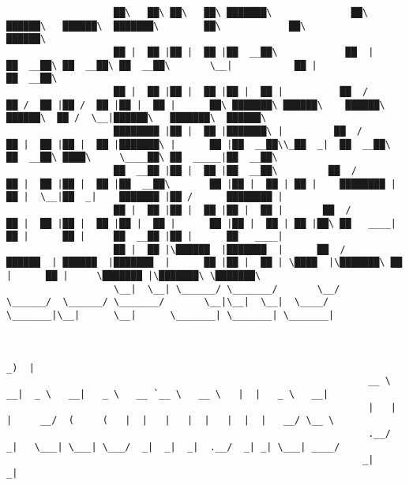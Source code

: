 \documentclass[varwidth=\maxdimen,margin=0.5cm,multi={verbatim}]{standalone}
\begin{document}
\begin{verbatim}
                   ██\   ██\ ██\   ██\ ███████\              ██\        ██████\   ██████\  ███████\        ██\            ██\                          ██████\
                   ██ |  ██ |██ |  ██ |██  __██\            ██  |      ██  __██\ ██  __██\ ██  __██\       \__|           ██ |                        ██  __██\
                   ██ |  ██ |██ |  ██ |██ |  ██ |          ██  /       ██ /  ██ |██ /  ██ |██ |  ██ |      ██\ ███████\ ██████\    ██████\   ██████\  ██ /  \__|██████\   ███████\  ██████\
                   ████████ |██ |  ██ |███████\ |         ██  /        ██ |  ██ |██ |  ██ |███████\ |      ██ |██  __██\\_██  _|  ██  __██\ ██  __██\ ████\     \____██\ ██  _____|██  __██\
                   ██  __██ |██ |  ██ |██  __██\         ██  /         ██ |  ██ |██ |  ██ |██  __██\       ██ |██ |  ██ | ██ |    ████████ |██ |  \__|██  _|    ███████ |██ /      ████████ |
                   ██ |  ██ |██ |  ██ |██ |  ██ |       ██  /          ██ |  ██ |██ |  ██ |██ |  ██ |      ██ |██ |  ██ | ██ |██\ ██   ____|██ |      ██ |     ██  __██ |██ |      ██   ____|
                   ██ |  ██ |\██████  |███████  |      ██  /            ██████  | ██████  |███████  |      ██ |██ |  ██ | \████  |\███████\ ██ |      ██ |     \███████ |\███████\ \███████\
                   \__|  \__| \______/ \_______/       \__/             \______/  \______/ \_______/       \__|\__|  \__|  \____/  \_______|\__|      \__|      \_______| \_______| \_______|


                                                                                                                _)  |
                                                                __ \    __|  _ \   __|   _ \   __ `__ \   __ \   |  |   _ \   __|
                                                                |   |  |     __/  (     (   |  |   |   |  |   |  |  |   __/ \__ \
                                                                .__/  _|   \___| \___| \___/  _|  _|  _|  .__/  _| _| \___| ____/
                                                               _|                                        _|


\end{verbatim}
\end{document}
